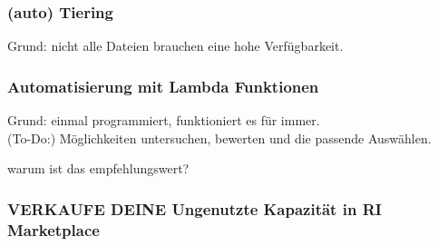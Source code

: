 \subsubsection{(auto) Tiering }
Grund: nicht alle Dateien brauchen eine hohe Verfügbarkeit.

\subsubsection{Automatisierung mit Lambda Funktionen}
Grund: einmal programmiert, funktioniert es für immer.
\\(To-Do:) Möglichkeiten untersuchen, bewerten und die passende Auswählen.

warum ist das empfehlungswert?

\subsubsection{VERKAUFE DEINE Ungenutzte Kapazität in RI Marketplace}



 
